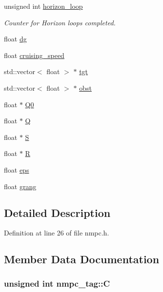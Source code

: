\begin{DoxyCompactItemize}
unsigned int \hyperlink{structnmpc__tag_a34ad117331404a09cc419fba8c2497e5}{horizon\-\_\-loop}
\begin{DoxyCompactList}\small\item\em Counter for Horizon loops completed. \end{DoxyCompactList}\item 
float \hyperlink{structnmpc__tag_a93dbd0a5fccb5439e666738854a501ee}{dg}
\item 
float \hyperlink{structnmpc__tag_a1ae55c15ff70d8c2abcb8170927224fa}{cruising\-\_\-speed}
\item 
std\-::vector$<$ float $>$ $\ast$ \hyperlink{structnmpc__tag_aa5fb945f7afd12e3724c6ce91e46c4a5}{tgt}
\item 
std\-::vector$<$ float $>$ $\ast$ \hyperlink{structnmpc__tag_a6289f56c8d80a427a8afe333fb4db027}{obst}
\item 
float $\ast$ \hyperlink{structnmpc__tag_a1ab0f5c3106cc5091a8a56d274aa7ccd}{Q0}
\item 
float $\ast$ \hyperlink{structnmpc__tag_a17b9178baecdfa5d433aaa6b148753cf}{Q}
\item 
float $\ast$ \hyperlink{structnmpc__tag_aedce8a78d2150f86bdccc38dcf2a1ff9}{S}
\item 
float $\ast$ \hyperlink{structnmpc__tag_affbe53126d0a4a84be7125ff806e7c67}{R}
\item 
float \hyperlink{structnmpc__tag_a761da0966b29740c4a6e8fa6381b2e9e}{eps}
\item 
float \hyperlink{structnmpc__tag_a68ad52003b1fedf8e75dc8ad1e188b30}{grang}
\end{DoxyCompactItemize}


\subsection{Detailed Description}


Definition at line 26 of file nmpc.\-h.



\subsection{Member Data Documentation}
\hypertarget{structnmpc__tag_a48579bcab6b011067bdf223e51ed489b}{
\subsubsection[{C}]{\setlength{\rightskip}{0pt plus 5cm}unsigned int nmpc\-\_\-tag\-::\-C}}\label{structnmpc__tag_a48579bcab6b011067bdf223e51ed489b}


